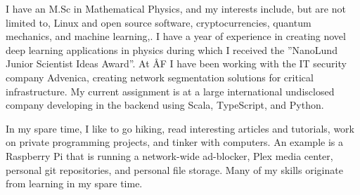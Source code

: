 

I have an M.Sc in Mathematical Physics, and my interests include, but are not
limited to, Linux and open source software, cryptocurrencies, quantum
mechanics, and machine learning,. I have a year of experience in creating
novel deep learning applications in physics during which I received the
”NanoLund Junior Scientist Ideas Award”. At ÅF I have been working with the IT
security company Advenica, creating network segmentation solutions for
critical infrastructure. My current assignment is at a large international
undisclosed company developing in the backend using Scala, TypeScript, and
Python.

In my spare time, I like to go hiking, read interesting articles and
tutorials, work on private programming projects, and tinker with computers. An
example is a Raspberry Pi that is running a network-wide ad-blocker, Plex
media center, personal git repositories, and personal file storage. Many of my
skills originate from learning in my spare time.
